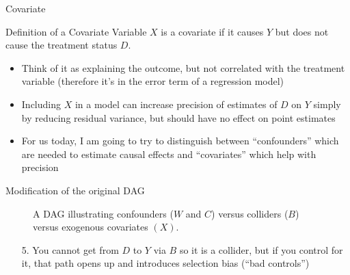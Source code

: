 \documentclass{beamer}
\begin{document}
\begin{frame}{Covariate}
	
	
	\begin{block}{Definition of a Covariate}
	Variable $X$ is a covariate if it causes $Y$ but does not cause the treatment status $D$.
	\end{block}
	
	\begin{itemize}
	\item Think of it as explaining the outcome, but not correlated with the treatment variable (therefore it's in the error term of a regression model)
	\item Including $X$ in a model can increase precision of estimates of $D$ on $Y$ simply by reducing residual variance, but should have no effect on point estimates
	\item For us today, I am going to try to distinguish between ``confounders'' which are needed to estimate causal effects and ``covariates'' which help with precision 
	\end{itemize}
	
\end{frame}

\begin{frame}{Modification of the original DAG}

\begin{figure}
\begin{center}
\caption{A DAG illustrating confounders ($W$ and $C$) versus colliders ($B$) versus exogenous covariates $(X)$.}
\label{fig:backdoor_dag}
\end{center}
\end{figure}

\begin{enumerate}
\item[5. ] You cannot get from $D$ to $Y$ via $B$ so it is a collider, but if you control for it, that path opens up and introduces selection bias (``bad controls'')
\end{enumerate}


\end{frame}
\end{document}
